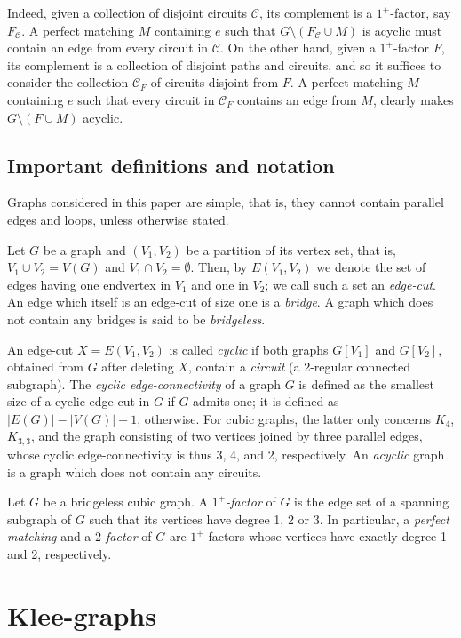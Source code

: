 \documentclass[]{theclass}
\begin{document}
Indeed, given a collection of disjoint circuits $\mathcal{C}$, its complement is a $1^+$-factor, say $F_{\mathcal{C}}$. A perfect matching $M$ containing $e$ such that $G \setminus (F_{\mathcal{C}} \cup M)$ is acyclic must contain an edge from every circuit in $\mathcal{C}$. On the other hand, given a $1^+$-factor $F$, its complement is a collection of disjoint paths and circuits, and so it suffices to consider the collection $\mathcal{C}_F$ of circuits disjoint from $F$. A perfect matching $M$ containing $e$ such that every circuit in $\mathcal{C}_F$ contains an edge from $M$, clearly makes 
$G\setminus (F \cup M)$ acyclic. 

\subsection{Important definitions and notation}

Graphs considered in this paper are simple, that is, they cannot contain parallel edges and loops, unless otherwise stated. 

Let $G$ be a graph and $(V_1,V_2)$ be a partition of its vertex set, that is, $V_1\cup V_2=V(G)$ and $V_1\cap V_2=\emptyset$. Then, by $E(V_1,V_2)$ we denote the set of edges having one endvertex in $V_1$ and one in $V_2$; we call such a set an \emph{edge-cut}. An edge which itself is an edge-cut of size one is a \emph{bridge}. A graph which does not contain any bridges is said to be \emph{bridgeless}.

An edge-cut $X=E(V_1,V_2)$ is called \emph{cyclic} if both graphs $G[V_1]$ and $G[V_2]$, obtained from $G$ after deleting $X$, contain a \emph{circuit} (a 2-regular connected subgraph). The \emph{cyclic edge-connectivity} of a graph $G$ is defined as the smallest size of a cyclic edge-cut in $G$ if $G$ admits one; it is defined as $|E(G)|-|V(G)|+1$, otherwise. For cubic graphs, the latter only concerns $K_4$, $K_{3,3}$, and the graph consisting of two vertices joined by three parallel edges, whose cyclic edge-connectivity is thus 3, 4, and 2, respectively. An \emph{acyclic} graph is a graph which does not contain any circuits.

Let $G$ be a bridgeless cubic graph. A \emph{$1^+$-factor} of $G$ is the edge set of a spanning subgraph of $G$ such that its vertices have degree 1, 2 or 3. In particular, a \emph{perfect matching} and a \emph{$2$-factor} of $G$ are $1^+$-factors whose vertices have exactly degree 1 and 2, respectively. 

\section{Klee-graphs}\label{section kleegraphs}
\end{document}

